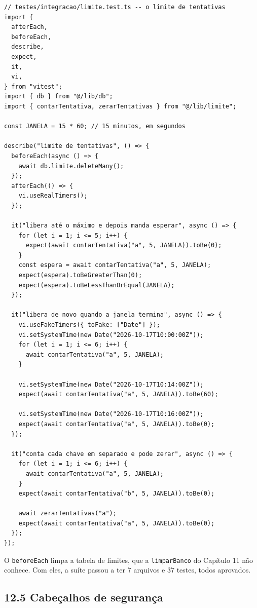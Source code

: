 \begin{codigo}
\begin{Verbatim}[breaklines=true, breaksymbolleft={}, fontsize=\footnotesize]
// testes/integracao/limite.test.ts -- o limite de tentativas
import {
  afterEach,
  beforeEach,
  describe,
  expect,
  it,
  vi,
} from "vitest";
import { db } from "@/lib/db";
import { contarTentativa, zerarTentativas } from "@/lib/limite";

const JANELA = 15 * 60; // 15 minutos, em segundos

describe("limite de tentativas", () => {
  beforeEach(async () => {
    await db.limite.deleteMany();
  });
  afterEach(() => {
    vi.useRealTimers();
  });

  it("libera até o máximo e depois manda esperar", async () => {
    for (let i = 1; i <= 5; i++) {
      expect(await contarTentativa("a", 5, JANELA)).toBe(0);
    }
    const espera = await contarTentativa("a", 5, JANELA);
    expect(espera).toBeGreaterThan(0);
    expect(espera).toBeLessThanOrEqual(JANELA);
  });

  it("libera de novo quando a janela termina", async () => {
    vi.useFakeTimers({ toFake: ["Date"] });
    vi.setSystemTime(new Date("2026-10-17T10:00:00Z"));
    for (let i = 1; i <= 6; i++) {
      await contarTentativa("a", 5, JANELA);
    }

    vi.setSystemTime(new Date("2026-10-17T10:14:00Z"));
    expect(await contarTentativa("a", 5, JANELA)).toBe(60);

    vi.setSystemTime(new Date("2026-10-17T10:16:00Z"));
    expect(await contarTentativa("a", 5, JANELA)).toBe(0);
  });

  it("conta cada chave em separado e pode zerar", async () => {
    for (let i = 1; i <= 6; i++) {
      await contarTentativa("a", 5, JANELA);
    }
    expect(await contarTentativa("b", 5, JANELA)).toBe(0);

    await zerarTentativas("a");
    expect(await contarTentativa("a", 5, JANELA)).toBe(0);
  });
});
\end{Verbatim}
\end{codigo}

O \texttt{beforeEach} limpa a tabela de limites, que a \texttt{limparBanco} do Capítulo 11 não conhece. Com eles, a suíte passou a ter 7 arquivos e 37 testes, todos aprovados.

\subsection{12.5 Cabeçalhos de segurança}

